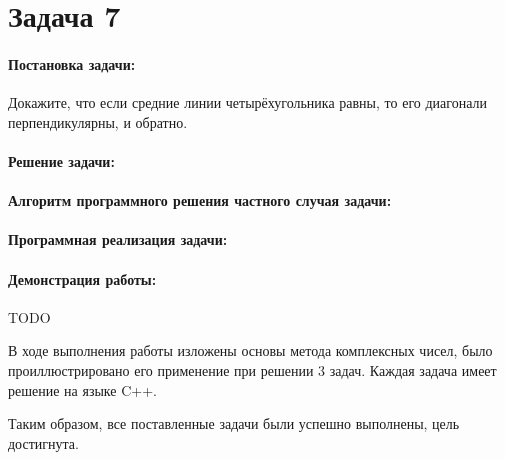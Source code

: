 {
   \section*{Задача 7}
   \paragraph{Постановка задачи:}
   Докажите, что если средние линии четырёхугольника равны,
   то его диагонали перпендикулярны, и обратно.
   \paragraph{Решение задачи:}
   \paragraph{Алгоритм программного решения частного случая задачи:}
   \paragraph{Программная реализация задачи:}
   \paragraph{Демонстрация работы:}
   TODO %
}
В ходе выполнения работы изложены основы метода комплексных чисел, было проиллюстрировано его
применение при решении 3 задач. Каждая задача имеет решение на языке C++.


Таким образом, все поставленные задачи были успешно выполнены, цель
достигнута.




